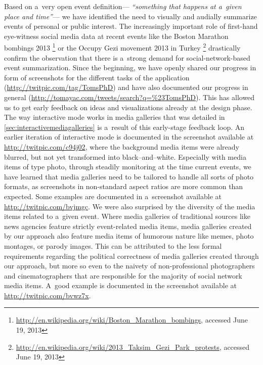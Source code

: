 Based on a~very open event definition---%
\textit{``something that happens at a~given place and time''}---%
we have identified the need to
visually and audially summarize events
of personal or public interest.
The increasingly important role of first-hand eye-witness
social media data at recent events like the
Boston Marathon bombings 2013%
\footnote{\url{http://en.wikipedia.org/wiki/Boston_Marathon_bombings}, accessed June 19, 2013}
or the Occupy Gezi movement 2013 in Turkey%
\footnote{\url{http://en.wikipedia.org/wiki/2013_Taksim_Gezi_Park_protests}, accessed June 19, 2013}
drastically confirm the observation that there is a~strong demand
for social-network-based event summarization.
Since the beginning, we have openly shared our progress
in form of screenshots for the different tasks
of the application
(\url{http://twitpic.com/tag/TomsPhD})
and have also documented our progress in general
(\url{http://tomayac.com/tweets/search?q=%23TomsPhD}).
This has allowed us to get early feedback on ideas
and visualizations already at the design phase.
The way interactive mode works in media galleries
that was detailed in \autoref{sec:interactivemediagalleries}
is a~result of this early-stage feedback loop. 
An earlier iteration of interactive mode
is documented in the screenshot available at
\url{http://twitpic.com/c94j02},
where the background media items were already blurred,
but not yet transformed into black--and--white.
Especially with media items of type photo,
through steadily monitoring at the time current events,
we have learned that media galleries
need to be tailored to handle all sorts of photo formats,
as screenshots in non-standard aspect ratios
are more common than expected.
Some examples are documented in a~screenshot available
at \url{http://twitpic.com/bvjmgc}.
We were also surprised by the diversity of the media items
related to a~given event.
Where media galleries of traditional sources
like news agencies feature strictly event-related media items,
media galleries created by our approach also feature
media items of humorous nature like memes, photo montages,
or parody images.
This can be attributed to the less formal requirements
regarding the political correctness of media galleries 
created through our approach,
but more so even to the naivety of non-professional
photographers and cinematographers
that are responsible for the majority of social network media items.
A~good example is documented in the screenshot available at
\url{http://twitpic.com/bvwz7x}.

